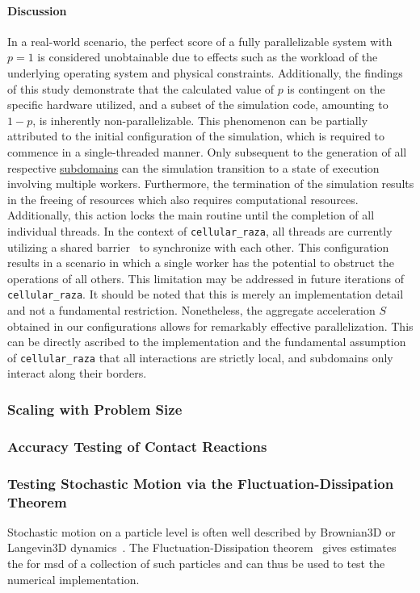 \documentclass[a4paper]{article}
\begin{document}
\paragraph{Discussion}
In a real-world scenario, the perfect score of a fully parallelizable system with $p=1$ is
considered unobtainable due to effects such as the workload of the underlying operating system and
physical constraints.
Additionally, the findings of this study demonstrate that the calculated value of $p$ is contingent
on the specific hardware utilized, and a subset of the simulation code, amounting to $1-p$, is
inherently non-parallelizable.
This phenomenon can be partially attributed to the initial configuration of the simulation, which is
required to commence in a single-threaded manner.
Only subsequent to the generation of all respective
\href{https://cellular-raza.com/docs/cellular_raza_core/backend/chili/struct.SubDomainBox.html}
{subdomains} can the simulation transition to a state of execution involving multiple workers.
Furthermore, the termination of the simulation results in the freeing of resources which also
requires computational resources.
Additionally, this action locks the main routine until the completion of all individual threads.
In the context of \texttt{cellular\_raza}, all threads are currently utilizing a shared
barrier~\cite{GjengsetHurdles2018} to synchronize with each other.
This configuration results in a scenario in which a single worker has the potential to obstruct the
operations of all others.
This limitation may be addressed in future iterations of \texttt{cellular\_raza}.
It should be noted that this is merely an implementation detail and not a fundamental restriction.
Nonetheless, the aggregate acceleration $S$ obtained in our configurations allows for remarkably
effective parallelization.
This can be directly ascribed to the implementation and the fundamental assumption of
\texttt{cellular\_raza} that all interactions are strictly local, and subdomains only interact along
their borders.

\subsubsection{Scaling with Problem Size}
\subsubsection{Accuracy Testing of Contact Reactions}
\subsubsection{Testing Stochastic Motion via the Fluctuation-Dissipation Theorem}
Stochastic motion on a particle level is often well described by Brownian3D or Langevin3D
dynamics~\cite{Brown1828,Lemons1997}.
The Fluctuation-Dissipation theorem~\cite{Callen1951} gives estimates the for \ac{msd} of a
collection of such particles and can thus be used to test the numerical
implementation.
\end{document}
